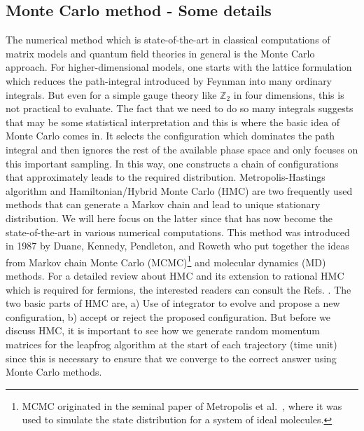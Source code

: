 \documentclass[letter,11pt]{article}
\begin{document}
\subsection{Monte Carlo method - Some details}
The numerical method which is state-of-the-art in classical computations 
of matrix models and quantum field theories in general is the Monte Carlo approach.
For higher-dimensional models, one starts with the lattice formulation which reduces the 
path-integral introduced by Feynman into many ordinary integrals. But even for a simple
gauge theory like $\mathbb{Z}_{2}$ in four dimensions, this is not practical to evaluate. 
The fact that we need to do so many integrals suggests that may be some statistical 
interpretation and this is where the basic idea of Monte Carlo comes in. It selects the 
configuration which dominates the path integral and then ignores the rest of the available
phase space and only focuses on this important sampling. In this way, one constructs a chain of configurations 
that approximately leads to the required distribution. 
Metropolis-Hastings algorithm and Hamiltonian/Hybrid Monte Carlo (HMC) 
are two frequently used methods that
can generate a Markov chain and lead to unique stationary distribution. 
We will here focus on the latter since that has now become the state-of-the-art in 
various numerical computations. This method was introduced in 
1987 by Duane, Kennedy, Pendleton, and Roweth \cite{Duane:1987de} who put together the ideas from
Markov chain Monte Carlo (MCMC)\footnote{MCMC originated in the seminal paper of 
Metropolis et al.~\cite{Metropolis:1953am}, where it was used to simulate the state distribution for a system of ideal molecules.} 
and molecular dynamics (MD) methods. 
For a detailed review about HMC and its extension to rational 
HMC which is required for fermions, the interested readers 
can consult the Refs. \cite{Hanada:2018fnp,Joseph:2019zer}. 
The two basic parts of HMC are, a) Use of integrator to evolve and propose a new configuration, b) accept or reject
the proposed configuration. But before we discuss HMC, 
it is important to see how we generate random momentum 
matrices for the leapfrog algorithm 
at the start of each trajectory (time unit) since 
this is necessary to ensure that we converge to the 
correct answer using Monte Carlo methods. 
\end{document}
